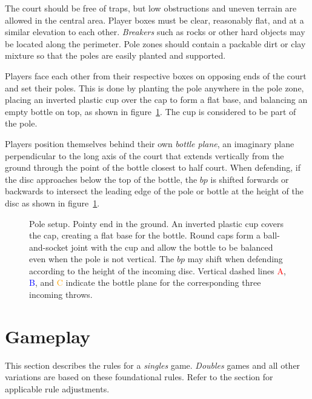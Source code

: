\documentclass[11pt,letterpaper,twocolumn,english,DIV=calc]{scrartcl}
\begin{document}
The court should be free of traps, but low obstructions and uneven terrain are allowed in the central area.
Player boxes must be clear, reasonably flat, and at a similar elevation to each other.
\emph{Breakers} such as rocks or other hard objects may be located along the perimeter.
Pole zones should contain a packable dirt or clay mixture so that the poles are easily planted and supported.

Players face each other from their respective boxes on opposing ends of the court and set their poles.
This is done by planting the pole anywhere in the pole zone, placing an inverted plastic cup over the cap to form a flat base, and balancing an empty bottle on top, as shown in figure~\ref{fig:pole-setup}. 
The cup is considered to be part of the pole.
 
Players position themselves behind their own \emph{bottle plane}, an imaginary plane perpendicular to the long axis of the court that extends vertically from the ground through the point of the bottle closest to half court.  
When defending, if the disc approaches below the top of the bottle, the $bp$ is shifted forwards or backwards to intersect the leading edge of the pole or bottle at the height of the disc as shown in figure~\ref{fig:pole-setup}.

\begin{figure}[!hbtp]
	\begin{centering}
		\vspace{-5mm}\par
	\end{centering}
	\caption{
		Pole setup. 
		Pointy end in the ground. 
		An inverted plastic cup covers the cap, creating a flat base for the bottle. 
		Round caps form a ball-and-socket joint with the cup and allow the bottle to be balanced even when the pole is not vertical.
		The $bp$ may shift when defending according to the height of the incoming disc. Vertical dashed lines \textcolor{red}{A}, \textcolor{blue}{B}, and \textcolor{orange}{C} indicate the bottle plane for the corresponding three incoming throws.
		\label{fig:pole-setup}
	}
\end{figure}

\clearpage
\part*{Gameplay}

This section describes the rules for a \emph{singles} game.
\emph{Doubles} games and all other variations are based on these foundational rules.
Refer to the  section for applicable rule adjustments.
	
\end{document}
